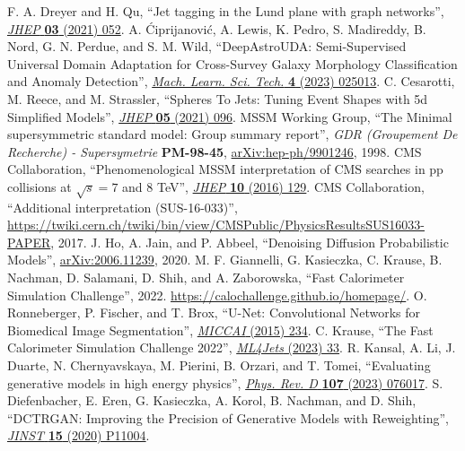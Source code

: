 \begin{thebibliography}{99}
 F. A. Dreyer and H. Qu, ``Jet tagging in the Lund plane with graph networks'', \href{https://doi.org/10.1007/JHEP03(2021)052}{\textit{JHEP} \textbf{03} (2021) 052}.
 A. \'Ciprijanovi\'c, A. Lewis, K. Pedro, S. Madireddy, B. Nord, G. N. Perdue, and S. M. Wild, ``DeepAstroUDA: Semi-Supervised Universal Domain Adaptation for Cross-Survey Galaxy Morphology Classification and Anomaly Detection'', \href{https://doi.org/10.1088/2632-2153/acca5f}{\textit{Mach. Learn. Sci. Tech.} \textbf{4} (2023) 025013}.
 C. Cesarotti, M. Reece, and M. Strassler, ``Spheres To Jets: Tuning Event Shapes with 5d Simplified Models'', \href{https://doi.org/10.1007/JHEP05(2021)096}{\textit{JHEP} \textbf{05} (2021) 096}.
 MSSM Working Group, ``The Minimal supersymmetric standard model: Group summary report'', \textit{GDR (Groupement De Recherche) - Supersymetrie} \textbf{PM-98-45}, \href{https://arxiv.org/abs/hep-ph/9901246}{arXiv:hep-ph/9901246}, 1998.
 CMS Collaboration, ``Phenomenological MSSM interpretation of CMS searches in pp collisions at $\sqrt{s} = 7$ and 8 TeV'', \href{https://doi.org/10.1007/JHEP10(2016)129}{\textit{JHEP} \textbf{10} (2016) 129}.
 CMS Collaboration, ``Additional interpretation (SUS-16-033)'', \href{https://twiki.cern.ch/twiki/bin/view/CMSPublic/PhysicsResultsSUS16033-PAPER}{https://twiki.cern.ch/twiki/bin/view/CMSPublic/PhysicsResultsSUS16033-PAPER}, 2017.
 J. Ho, A. Jain, and P. Abbeel, ``Denoising Diffusion Probabilistic Models'', \href{https://arxiv.org/abs/2006.11239}{arXiv:2006.11239}, 2020.
 M. F. Giannelli, G. Kasieczka, C. Krause, B. Nachman, D. Salamani, D. Shih, and A. Zaborowska, ``Fast Calorimeter Simulation Challenge'', 2022. \url{https://calochallenge.github.io/homepage/}.
 O. Ronneberger, P. Fischer, and T. Brox, ``U-Net: Convolutional Networks for Biomedical Image Segmentation'', \href{https://doi.org/10.1007/978-3-319-24574-4_28}{\textit{MICCAI} (2015) 234}.
 C. Krause, ``The Fast Calorimeter Simulation Challenge 2022'', \href{https://indico.cern.ch/event/1253794/contributions/5588599/}{\textit{ML4Jets} (2023) 33}.
 R. Kansal, A. Li, J. Duarte, N. Chernyavskaya, M. Pierini, B. Orzari, and T. Tomei, ``Evaluating generative models in high energy physics'', \href{https://doi.org/10.1103/PhysRevD.107.076017}{\textit{Phys. Rev. D} \textbf{107} (2023) 076017}.
 S. Diefenbacher, E. Eren, G. Kasieczka, A. Korol, B. Nachman, and D. Shih, ``DCTRGAN: Improving the Precision of Generative Models with Reweighting'', \href{https://doi.org/10.1088/1748-0221/15/11/P11004}{\textit{JINST} \textbf{15} (2020) P11004}.

\end{thebibliography}
